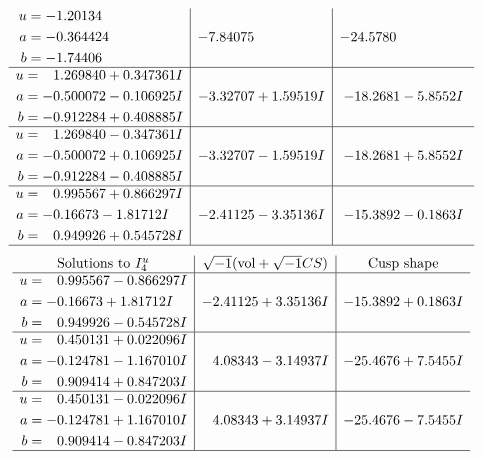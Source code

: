 \documentclass[1p]{elsarticle_modified}
\theoremstyle{definition}
\newcommand{\I}{\sqrt{-1}}
\begin{document}
$$\begin{array}{c|c|c}
\begin{aligned}
u &= -1.20134\phantom{ +0.000000I} \\
a &= -0.364424\phantom{ +0.000000I} \\
b &= -1.74406\phantom{ +0.000000I}\end{aligned}
 & -7.84075\phantom{ +0.000000I} & -24.5780\phantom{ +0.000000I} \\ \hline\begin{aligned}
u &= \phantom{-}1.269840 + 0.347361 I \\
a &= -0.500072 - 0.106925 I \\
b &= -0.912284 + 0.408885 I\end{aligned}
 & -3.32707 + 1.59519 I & -18.2681 - 5.8552 I \\ \hline\begin{aligned}
u &= \phantom{-}1.269840 - 0.347361 I \\
a &= -0.500072 + 0.106925 I \\
b &= -0.912284 - 0.408885 I\end{aligned}
 & -3.32707 - 1.59519 I & -18.2681 + 5.8552 I \\ \hline\begin{aligned}
u &= \phantom{-}0.995567 + 0.866297 I \\
a &= -0.16673 - 1.81712 I \\
b &= \phantom{-}0.949926 + 0.545728 I\end{aligned}
 & -2.41125 - 3.35136 I & -15.3892 - 0.1863 I\\
 \hline 
 \end{array}$$\newpage$$\begin{array}{c|c|c}  
\text{Solutions to }I^u_{4}& \I (\text{vol} + \sqrt{-1}CS) & \text{Cusp shape}\\
 \hline 
\begin{aligned}
u &= \phantom{-}0.995567 - 0.866297 I \\
a &= -0.16673 + 1.81712 I \\
b &= \phantom{-}0.949926 - 0.545728 I\end{aligned}
 & -2.41125 + 3.35136 I & -15.3892 + 0.1863 I \\ \hline\begin{aligned}
u &= \phantom{-}0.450131 + 0.022096 I \\
a &= -0.124781 - 1.167010 I \\
b &= \phantom{-}0.909414 + 0.847203 I\end{aligned}
 & \phantom{-}4.08343 - 3.14937 I & -25.4676 + 7.5455 I \\ \hline\begin{aligned}
u &= \phantom{-}0.450131 - 0.022096 I \\
a &= -0.124781 + 1.167010 I \\
b &= \phantom{-}0.909414 - 0.847203 I\end{aligned}
 & \phantom{-}4.08343 + 3.14937 I & -25.4676 - 7.5455 I\\
 \hline 
 \end{array}$$\newpage\newpage\renewcommand{\arraystretch}{1}
\end{document}
